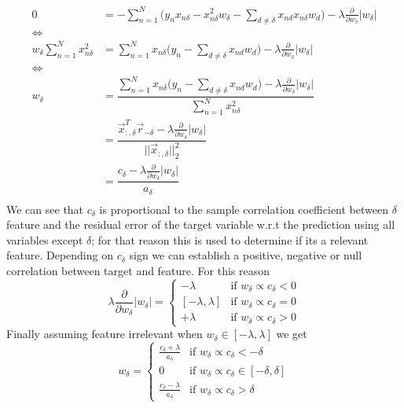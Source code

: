 \documentclass[../../main.tex]{subfiles}
\begin{document}
\begin{align*}
    0
    &= -\sum_{n=1}^N \Big(y_n x_{n\delta} - x_{n\delta}^2 w_\delta - \sum_{d\neq\delta} x_{nd}x_{n\delta}w_d\Big) - \lambda \frac{\partial}{\partial w_\delta}|w_\delta|\\
    \Longleftrightarrow&\\
    w_\delta\sum_{n=1}^N x_{n\delta}^2
    &= \sum_{n=1}^N x_{n\delta}\Big( y_n - \sum_{d\neq\delta} x_{nd}w_d\Big) - \lambda \frac{\partial}{\partial w_\delta}|w_\delta|\\
    \Longleftrightarrow&\\
    w_\delta
    &= \dfrac{\sum_{n=1}^N x_{n\delta}\Big( y_n - \sum_{d\neq\delta} x_{nd}w_d\Big) - \lambda \frac{\partial}{\partial w_\delta}|w_\delta|}{\sum_{n=1}^N x_{n\delta}^2}\\
    &= \dfrac{\vec{x}_{:,\delta}^T  \vec{r}_{-\delta} - \lambda \frac{\partial}{\partial w_\delta}|w_\delta|}{||\vec{x}_{:,\delta}||_2^2}\\
    &= \dfrac{c_\delta - \lambda \frac{\partial}{\partial w_\delta}|w_\delta|}{a_\delta}\\  
\end{align*}
We can see that $c_\delta$ is proportional to the sample correlation coefficient between $\delta$ feature and the residual error of the target variable w.r.t the prediction using all variables except $\delta$; for that reason this is used to determine if its a relevant feature. Depending on $c_\delta$ sign we can establish a positive, negative or null correlation between target and feature.
For this reason
\begin{equation*}
    \lambda \frac{\partial}{\partial w_\delta}|w_\delta| = 
    \begin{cases}
        -\lambda & \text{if } w_\delta \propto c_\delta < 0 \\
        [-\lambda, \lambda] & \text{if } w_\delta \propto c_\delta = 0 \\
        +\lambda & \text{if } w_\delta \propto c_\delta >0
    \end{cases}
\end{equation*}
Finally assuming feature irrelevant when $w_\delta\in[-\lambda,\lambda]$ we get
\begin{equation*}
    w_\delta=
    \begin{cases}
        \frac{c_\delta + \lambda}{a_\delta} & \text{if } w_\delta \propto c_\delta < -\delta \\
        0 & \text{if } w_\delta \propto c_\delta \in [-\delta,\delta] \\
        \frac{c_\delta - \lambda}{a_\delta} & \text{if } w_\delta \propto c_\delta > \delta
    \end{cases}
\end{equation*}
\end{document}
